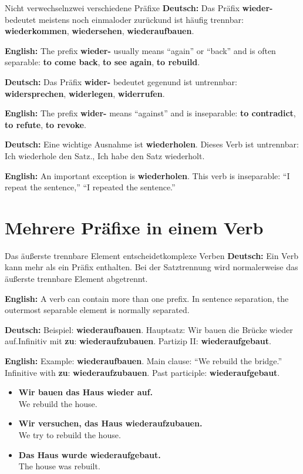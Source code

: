\documentclass[a4paper,11pt]{article}
\newcommand{\GermanText}[1]{\textbf{Deutsch: }#1\par}
\newcommand{\EnglishText}[1]{{\small\color{SoftGray}\textbf{English: }#1\par}}
\newcommand{\ExampleItem}[2]{\item \textbf{#1}\\{\small\color{SoftGray}#2}}
\begin{document}
        \begin{grammarentry}{Nicht verwechseln}{zwei verschiedene Präfixe}
            \GermanText{Das Präfix \textbf{wieder-} bedeutet meistens \glqq noch einmal\grqq oder \glqq zurück\grqq und ist häufig trennbar: \textbf{wiederkommen}, \textbf{wiedersehen}, \textbf{wiederaufbauen}.}
            \EnglishText{The prefix \textbf{wieder-} usually means ``again'' or ``back'' and is often separable: \textbf{to come back}, \textbf{to see again}, \textbf{to rebuild}.}

            \GermanText{Das Präfix \textbf{wider-} bedeutet \glqq gegen\grqq und ist untrennbar: \textbf{widersprechen}, \textbf{widerlegen}, \textbf{widerrufen}.}
            \EnglishText{The prefix \textbf{wider-} means ``against'' and is inseparable: \textbf{to contradict}, \textbf{to refute}, \textbf{to revoke}.}

            \GermanText{Eine wichtige Ausnahme ist \textbf{wiederholen}. Dieses Verb ist untrennbar: \glqq Ich wiederhole den Satz.\grqq, \glqq Ich habe den Satz wiederholt.\grqq}
            \EnglishText{An important exception is \textbf{wiederholen}. This verb is inseparable: ``I repeat the sentence,'' ``I repeated the sentence.''}
        \end{grammarentry}


    \section{Mehrere Präfixe in einem Verb}

        \begin{grammarentry}{Das äußerste trennbare Element entscheidet}{komplexe Verben}
            \GermanText{Ein Verb kann mehr als ein Präfix enthalten. Bei der Satztrennung wird normalerweise das äußerste trennbare Element abgetrennt.}
            \EnglishText{A verb can contain more than one prefix. In sentence separation, the outermost separable element is normally separated.}

            \GermanText{Beispiel: \textbf{wiederaufbauen}. Hauptsatz: \glqq Wir bauen die Brücke wieder auf.\grqq Infinitiv mit \textbf{zu}: \textbf{wiederaufzubauen}. Partizip II: \textbf{wiederaufgebaut}.}
            \EnglishText{Example: \textbf{wiederaufbauen}. Main clause: ``We rebuild the bridge.'' Infinitive with \textbf{zu}: \textbf{wiederaufzubauen}. Past participle: \textbf{wiederaufgebaut}.}
        \end{grammarentry}

        \begin{exbox}
            \begin{itemize}
                \ExampleItem{Wir bauen das Haus wieder auf.}{We rebuild the house.}
                \ExampleItem{Wir versuchen, das Haus wiederaufzubauen.}{We try to rebuild the house.}
                \ExampleItem{Das Haus wurde wiederaufgebaut.}{The house was rebuilt.}
            \end{itemize}
        \end{exbox}
\end{document}
